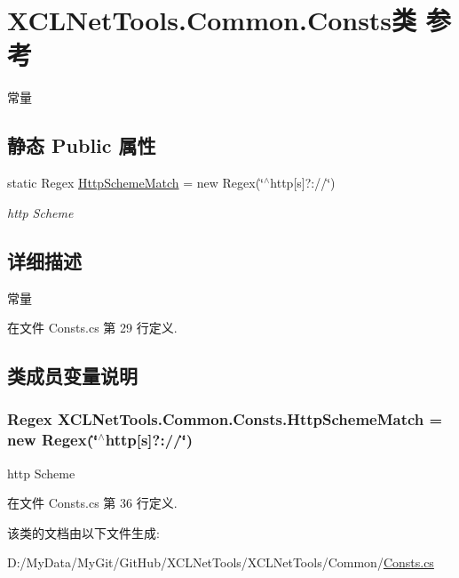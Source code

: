 \hypertarget{class_x_c_l_net_tools_1_1_common_1_1_consts}{\section{X\-C\-L\-Net\-Tools.\-Common.\-Consts类 参考}
\label{class_x_c_l_net_tools_1_1_common_1_1_consts}
}


常量  


\subsection*{静态 Public 属性}
\begin{DoxyCompactItemize}
\item 
static Regex \hyperlink{class_x_c_l_net_tools_1_1_common_1_1_consts_ab0d0e324cefcf408cb91eb4970cab692}{Http\-Scheme\-Match} = new Regex(\char`\"{}$^\wedge$http\mbox{[}s\mbox{]}?\-://\char`\"{})
\begin{DoxyCompactList}\small\item\em http Scheme \end{DoxyCompactList}\end{DoxyCompactItemize}


\subsection{详细描述}
常量 



在文件 Consts.\-cs 第 29 行定义.



\subsection{类成员变量说明}
\hypertarget{class_x_c_l_net_tools_1_1_common_1_1_consts_ab0d0e324cefcf408cb91eb4970cab692}{
\subsubsection[{Http\-Scheme\-Match}]{\setlength{\rightskip}{0pt plus 5cm}Regex X\-C\-L\-Net\-Tools.\-Common.\-Consts.\-Http\-Scheme\-Match = new Regex(\char`\"{}$^\wedge$http\mbox{[}s\mbox{]}?\-://\char`\"{})\hspace{0.3cm}{\ttfamily [static]}}}\label{class_x_c_l_net_tools_1_1_common_1_1_consts_ab0d0e324cefcf408cb91eb4970cab692}


http Scheme 



在文件 Consts.\-cs 第 36 行定义.



该类的文档由以下文件生成\-:\begin{DoxyCompactItemize}
\item 
D\-:/\-My\-Data/\-My\-Git/\-Git\-Hub/\-X\-C\-L\-Net\-Tools/\-X\-C\-L\-Net\-Tools/\-Common/\hyperlink{_consts_8cs}{Consts.\-cs}\end{DoxyCompactItemize}
